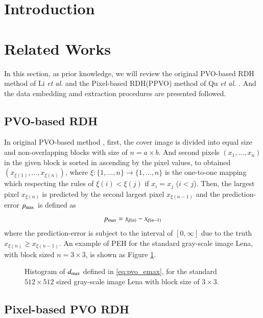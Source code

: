 \documentclass[review,3p,10pt,sort&compress]{elsarticle}
\begin{document}
\section{Introduction}\label{sec:1}

\section{Related Works}\label{sec:2}
In this section, as prior knowledge, we will review the original PVO-based RDH method of Li \emph{et al.} \cite{Li2013PVO} and the Pixel-based RDH(PPVO) method of Qu \emph{et al.} \cite{Qu2015PPVO}. And the data embedding amd extraction procedures are presented followed.

\subsection{PVO-based RDH}\label{sec:2.1}
In original PVO-based method \cite{Li2013PVO}, first, the cover image is divided into equal size and non-overlapping blocks with size of $n = a \times b$. And second pixels $(x_{1},...,x_{n})$ in the given block is sorted in ascending by the pixel values, to obtained $(x_{\xi(1)},...,x_{\xi(n)})$, where $\xi : \{1,...,n\} \rightarrow \{1,...,n\}$ is the one-to-one mapping which respecting the rules of $\xi(i) < \xi(j)$ if $x_{i} = x_{j}$ ($i < j$).  Then, the largest pixel $x_{\xi(n)}$ is predicted by the second largest pixel $x_{\xi(n-1)}$ and the prediction-error $p_{\rm max}$ is defined as 
\begin{equation}\label{eq:pvo_emax}
p_{\rm max} = x_{\xi(n)} - x_{\xi(n-1)}
\end{equation}
where the prediction-error is subject to the interval of $[0, \infty]$ due to the truth $x_{\xi(n)} \geq x_{\xi(n-1)}$. An example of PEH for the standard gray-scale image Lena, with block sized $n = 3 \times 3$, is shown as Figure \ref{Fig.PVOLenaHist}.
\begin{figure}
   \centering
   \caption{Histogram of $d_{\rm max}$ defined in \eqref{eq:pvo_emax}, for the standard $512 \times 512$ sized gray-scale image Lena with block size of $3 \times 3$.}
   \label{Fig.PVOLenaHist}
\end{figure}

\subsection{Pixel-based PVO RDH}\label{sec:2.2}




\end{document}
